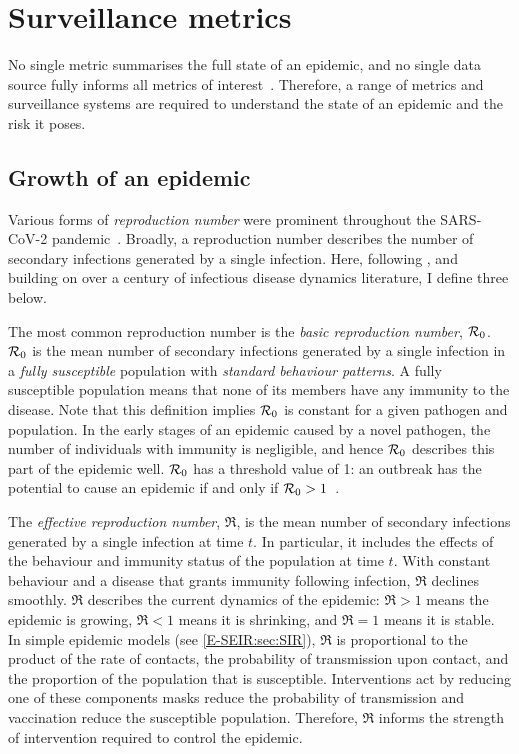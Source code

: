\documentclass[thesis.tex]{subfiles}
\begin{document}
\section{Surveillance metrics} \label{intro:sec:metrics}

No single metric summarises the full state of an epidemic, and no single data source fully informs all metrics of interest~\autocite{royalSocietyRnumber,pellisEstimation,paragGrowthRates}.
Therefore, a range of metrics and surveillance systems are required to understand the state of an epidemic and the risk it poses.

\subsection{Growth of an epidemic}

Various forms of \emph{reproduction number} were prominent throughout the SARS-CoV-2 pandemic~\autocite{pellisEstimation}.
Broadly, a reproduction number describes the number of secondary infections generated by a single infection.
Here, following \textcite{pellisEstimation}, and building on over a century of infectious disease dynamics literature, I define three below.

The most common reproduction number is the \emph{basic reproduction number}, $\mathcal{R}_{0}$.
$\mathcal{R}_{0}$ is the mean number of secondary infections generated by a single infection in a \emph{fully susceptible} population with \emph{standard behaviour patterns}.
A fully susceptible population means that none of its members have any immunity to the disease.
Note that this definition implies $\mathcal{R}_{0}$ is constant for a given pathogen and population.
In the early stages of an epidemic caused by a novel pathogen, the number of individuals with immunity is negligible, and hence $\mathcal{R}_{0}$ describes this part of the epidemic well.
$\mathcal{R}_{0}$ has a threshold value of 1: an outbreak has the potential to cause an epidemic if and only if $\mathcal{R}_{0} > 1$~\autocite[76]{diekmannMathematical}.

The \emph{effective reproduction number}, $\Re$, is the mean number of secondary infections generated by a single infection at time $t$.
In particular, it includes the effects of the behaviour and immunity status of the population at time $t$.
With constant behaviour and a disease that grants immunity following infection, $\Re$ declines smoothly.
$\Re$ describes the current dynamics of the epidemic: $\Re > 1$ means the epidemic is growing, $\Re < 1$ means it is shrinking, and $\Re = 1$ means it is stable.
In simple epidemic models (see \cref{E-SEIR:sec:SIR}), $\Re$ is proportional to the product of the rate of contacts, the probability of transmission upon contact, and the proportion of the population that is susceptible.
Interventions act by reducing one of these components \eg masks reduce the probability of transmission and vaccination reduce the susceptible population.
Therefore, $\Re$ informs the strength of intervention required to control the epidemic.
\end{document}
